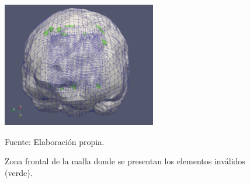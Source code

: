 
\begin{figure}[!ht]
    \centering
    \includegraphics[width=0.6\textwidth]{figures/labeled_octs/labeled_oct_c_5r7_0.png}
    \caption{ Zona frontal de la malla donde se presentan los elementos inválidos (verde). }
    Fuente: Elaboración propia.
    \label{fig:cortex_surf_oct_labeled}
\end{figure}

